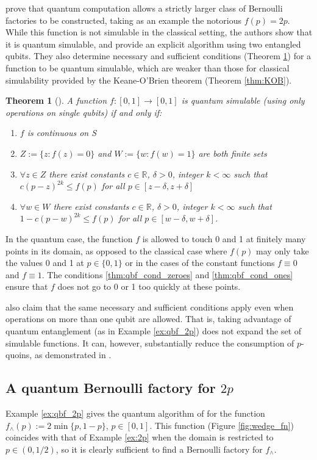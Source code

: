 \documentclass{article}
\newtheorem{thm}{Theorem}
\theoremstyle{definition}
\begin{document}
\citet{dale2015} prove that quantum computation allows a strictly larger class of Bernoulli factories to be constructed, taking as an example the notorious $f(p)=2p$. While this function is not simulable in the classical setting, the authors show that it is quantum simulable, and provide an explicit algorithm using two entangled qubits.
They also determine necessary and sufficient conditions (Theorem \ref{thm:qbf_simulable}) for a function to be quantum simulable, which are weaker than those for classical simulability provided by the Keane-O'Brien theorem (Theorem \ref{thm:KOB}).

\begin{thm}[{\citet[Theorem 1]{dale2015}}]\label{thm:qbf_simulable}
A function $f:[0,1]\to[0,1]$ %
is quantum simulable (using only operations on single qubits) if and only if:
\begin{enumerate}[label=(\alph*)]
\item $f$ is continuous on S
\item $Z:=\{z:f(z)=0\}$ and $W:=\{w:f(w)=1\}$ are both finite sets
\item\label{thm:qbf_cond_zeroes} $\forall z\in Z$ there exist constants $c\in\mathbb{R}$, $\delta>0$, integer $k<\infty$ such that $c(p-z)^{2k} \leq f(p)$ for all $p \in [z-\delta, z+\delta]$
\item\label{thm:qbf_cond_ones} $\forall w\in W$ there exist constants $c\in\mathbb{R}$, $\delta>0$, integer $k<\infty$ such that $1 - c(p-w)^{2k} \leq f(p)$ for all $p \in [w-\delta, w+\delta]$.
\end{enumerate}
\end{thm}
In the quantum case, the function $f$ is allowed to touch 0 and 1 at finitely many points in its domain, as opposed to the classical case where $f(p)$ may only take the values 0 and 1 at $p\in\{0,1\}$ or in the cases of the constant functions $f\equiv 0$ and $f\equiv 1$.
The conditions \ref{thm:qbf_cond_zeroes} and \ref{thm:qbf_cond_ones} ensure that $f$ does not go to 0 or 1 too quickly at these points. %

\citet{dale2015} also claim that the same necessary and sufficient conditions apply even when operations on more than one qubit are allowed. That is, taking advantage of quantum entanglement (as in Example \ref{ex:qbf_2p}) does not expand the set of simulable functions. It can, however, substantially reduce the consumption of $p$-quoins, as demonstrated in \citet{patel2018}.


\subsection{A quantum Bernoulli factory for $2p$}
Example \ref{ex:qbf_2p} gives the quantum algorithm of \citet{dale2015} for the function $f_\wedge(p) := 2\min\{p, 1-p\}$, $p\in[0,1]$. This function (Figure \ref{fig:wedge_fn}) coincides with that of Example \ref{ex:2p} when the domain is restricted to $p\in(0,1/2)$, so it is clearly sufficient to find a Bernoulli factory for $f_\wedge$.
\end{document}
